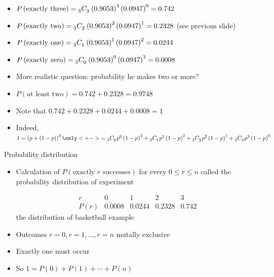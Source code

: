 \documentclass[handout,xcolor=dvipsnames]{beamer}
\theoremstyle{definition}
\newcommand\ncr[2]{\tensor[_{#1}]C{_{#2}}}
\begin{document}
\begin{frame}
\begin{itemize}
\item $P\left(\text{exactly three}\right)
=\ncr{3}{3}\left(0.9053\right)^3\left(0.0947\right)^0=0.742$
\item $P\left(\text{exactly two}\right)
=\ncr{3}{2}\left(0.9053\right)^2\left(0.0947\right)^1=0.2328$
(see previous slide)
\item $P\left(\text{exactly one}\right)
=\ncr{3}{1}\left(0.9053\right)^1\left(0.0947\right)^2=0.0244$
\item $P\left(\text{exactly zero}\right)
=\ncr{3}{0}\left(0.9053\right)^0\left(0.0947\right)^3=0.0008$
\item More realistic question: probability he makes two or more?
\item $P\left(\text{at least two}\right)=0.742+0.2328=0.9748$
\item Note that $0.742+0.2328+0.0244+0.0008=1$
\item Indeed, $1=\left(p+\left(1-p\right)\right)^3
\only<+->{=
\ncr{3}{0}p^0\left(1-p\right)^3
+\ncr{3}{1}p^1\left(1-p\right)^2
+\ncr{3}{2}p^2\left(1-p\right)^1
+\ncr{3}{3}p^3\left(1-p\right)^0}$
\end{itemize}
\end{frame}

\begin{frame}{Probability distribution}
\begin{itemize}
\item Calculation of $P\left(\text{exactly $r$ successes}\right)$
for every $0\le r\le n$ called the \alert{probability distribution}
of experiment
\begin{example}
\[\begin{array}{r|rrrr}
r&0&1&2&3\\\hline
P\left(r\right)
&0.0008&0.0244&0.2328&0.742
\end{array}\]
the distribution of basketball example
\end{example}
\item Outcomes $r=0,r=1,\ldots,r=n$
mutally exclusive
\item Exactly one must occur
\item So $1=
P\left(0\right)+P\left(1\right)+\cdots+P\left(n\right)$
\end{itemize}
\end{frame}
\end{document}
